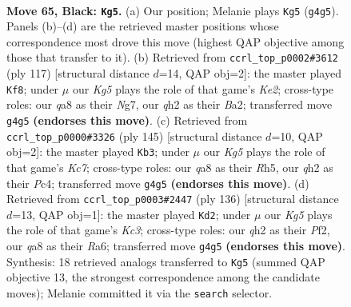\documentclass[11pt]{article}
\begin{document}
\clearpage

\begin{figure}[p]\centering
\begin{subfigure}{0.46\textwidth}\centering
\resizebox{\linewidth}{!}{%
\newchessgame
\chessboard[
  setfen={Q7/6B1/5R2/8/3K2k1/8/7Q/8 b - - 0 65},
  showmover=false,
  pgfstyle=straightmove, color=movearrow, markmove={g4-g5}
]}
\caption{}
\end{subfigure}\hfill
\begin{subfigure}{0.46\textwidth}\centering
\resizebox{\linewidth}{!}{%
\newchessgame
\chessboard[
  setfen={8/1R2k1n1/2B5/4K3/8/8/b7/8 b - - 28 59},
  showmover=false,
  pgfstyle=straightmove, color=movearrow, markmove={e7-f8}
]}
\caption{}
\end{subfigure}
\\[4pt]
\begin{subfigure}{0.46\textwidth}\centering
\resizebox{\linewidth}{!}{%
\newchessgame
\chessboard[
  setfen={8/6R1/5B2/7r/2p1K3/8/2k5/8 b - - 1 73},
  showmover=false,
  pgfstyle=straightmove, color=movearrow, markmove={c2-b3}
]}
\caption{}
\end{subfigure}\hfill
\begin{subfigure}{0.46\textwidth}\centering
\resizebox{\linewidth}{!}{%
\newchessgame
\chessboard[
  setfen={8/1r6/R7/3bk3/8/2K5/5P2/8 w - - 4 69},
  showmover=false,
  pgfstyle=straightmove, color=movearrow, markmove={c3-d2}
]}
\caption{}
\end{subfigure}
\caption{\textbf{Move 65, Black: \texttt{Kg5}.} (a) Our position; Melanie plays \texttt{Kg5} (\texttt{g4g5}). Panels (b)--(d) are the retrieved master positions whose correspondence most drove this move (highest QAP objective among those that transfer to it). (b) Retrieved from \texttt{ccrl\_top\_p0002\#3612} (ply 117) [structural distance $d$=14, QAP obj=2]: the master played \texttt{Kf8}; under $\mu$ our \emph{Kg5} plays the role of that game's \emph{Ke2}; cross-type roles: our \emph{q}a8 as their \emph{N}g7, our \emph{q}h2 as their \emph{B}a2; transferred move \texttt{g4g5} \textbf{(endorses this move)}. (c) Retrieved from \texttt{ccrl\_top\_p0000\#3326} (ply 145) [structural distance $d$=10, QAP obj=2]: the master played \texttt{Kb3}; under $\mu$ our \emph{Kg5} plays the role of that game's \emph{Kc7}; cross-type roles: our \emph{q}a8 as their \emph{R}h5, our \emph{q}h2 as their \emph{P}c4; transferred move \texttt{g4g5} \textbf{(endorses this move)}. (d) Retrieved from \texttt{ccrl\_top\_p0003\#2447} (ply 136) [structural distance $d$=13, QAP obj=1]: the master played \texttt{Kd2}; under $\mu$ our \emph{Kg5} plays the role of that game's \emph{Kc3}; cross-type roles: our \emph{q}h2 as their \emph{P}f2, our \emph{q}a8 as their \emph{R}a6; transferred move \texttt{g4g5} \textbf{(endorses this move)}. Synthesis: 18 retrieved analogs transferred to \texttt{Kg5} (summed QAP objective 13, the strongest correspondence among the candidate moves); Melanie committed it via the \texttt{search} selector.}
\label{fig:thought-m129}
\end{figure}
\end{document}
